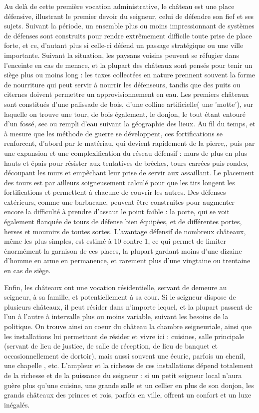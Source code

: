 \documentclass[10pt,a4paper]{book}
\begin{document}
Au delà de cette première vocation administrative, le château est une place défensive, illustrant le premier devoir du seigneur, celui de défendre son fief et ses sujets. Suivant la période, un ensemble plus ou moins impressionnant de systèmes de défenses sont construits pour rendre extrêmement difficile toute prise de place forte, et ce, d'autant plus si celle-ci défend un passage stratégique ou une ville importante. Suivant la situation, les paysans voisins peuvent se réfugier dans l'enceinte en cas de menace, et la plupart des châteaux sont pensés pour tenir un siège plus ou moins long : les taxes collectées en nature prennent souvent la forme de nourriture qui peut servir à nourrir les défenseurs, tandis que des puits ou citernes doivent permettre un approvisionnement en eau. Les premiers châteaux sont constitués d'une palissade de bois, d'une colline artificielle( une 'motte'), sur laquelle on trouve une tour, de bois également, le donjon, le tout étant entouré d'un fossé, sec ou rempli d'eau suivant la géographie des lieux. Au fil du temps, et à mesure que les méthode de guerre se développent, ces fortifications se renforcent, d'abord par le matériau, qui devient rapidement de la pierre,, puis par une expansion et une complexification du réseau défensif : murs de plus en plus hauts et épais pour résister aux tentatives de brèches, tours carrées puis rondes, découpant les murs et empêchant leur prise de servir aux assaillant. Le placement des tours est par ailleurs soigneusement calculé pour que les tirs longent les fortifications et permettent à chacune de couvrir les autres. Des défenses extérieurs, comme une barbacane, peuvent être construites pour augmenter encore la difficulté à prendre d'assaut le point faible : la porte, qui se voit également flanquée de tours de défense bien équipées, et de différentes portes, herses et mouroirs de toutes sortes. L'avantage défensif de nombreux châteaux, même les plus simples, est estimé à 10 contre 1, ce qui permet de limiter énormément la garnison de ces places, la plupart gardant moins d'une dizaine d'homme en arme en permanence, et rarement plus d'une vingtaine ou trentaine en cas de siège.

Enfin, les châteaux ont une vocation résidentielle, servant de demeure au seigneur, à sa famille, et potentiellement à sa cour. Si le seigneur dispose de plusieurs châteaux, il peut résider dans n'importe lequel, et la plupart passent de l'un à l'autre à intervalle plus ou moins variable, suivant les besoins de la politique. On trouve ainsi au coeur du château la chambre seigneuriale, ainsi que les installations lui permettant de résider et vivre ici : cuisines, salle principale (servant de lieu de justice, de salle de réception, de lieu de banquet et occasionnellement de dortoir), mais aussi souvent une écurie, parfois un chenil, une chapelle , etc. L'ampleur et la richesse de ces installations dépend totalement de la richesse et de la puissance du seigneur : si un petit seigneur local n'aura guère plus qu'une cuisine, une grande salle et un cellier en plus de son donjon, les grands châteaux des princes et rois, parfois en ville, offrent un confort et un luxe inégalés.
\end{document}
